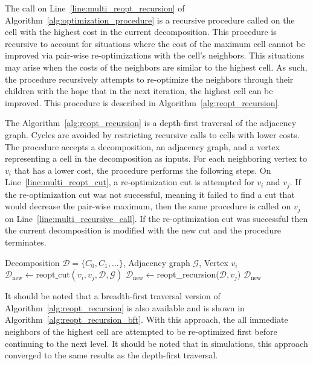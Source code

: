 \documentclass[../main.tex]{subfiles}
\begin{document}
The call on Line~\ref{line:multi_reopt_recursion} of Algorithm~\ref{alg:optimization_procedure} is a recursive procedure called on the cell with the highest cost in the current decomposition. This procedure is recursive to account for situations where the cost of the maximum cell cannot be improved via pair-wise re-optimizations with the cell's neighbors. This situations may arise when the costs of the neighbors are similar to the highest cell. As such, the procedure recursively attempts to re-optimize the neighbors through their children with the hope that in the next iteration, the highest cell can be improved. This procedure is described in Algorithm~\ref{alg:reopt_recursion}.

The Algorithm~\ref{alg:reopt_recursion} is a depth-first traversal of the adjacency graph. Cycles are avoided by restricting recursive calls to cells with lower costs. The procedure accepts a decomposition, an adjacency graph, and a vertex representing a cell in the decomposition as inputs. For each neighboring vertex to $v_i$ that has a lower cost, the procedure performs the following steps. On Line~\ref{line:multi_reopt_cut}, a re-optimization cut is attempted for $v_i$ and $v_j$. If the re-optimization cut was not successful, meaning it failed to find a cut that would decrease the pair-wise maximum, then the same procedure is called on $v_j$ on Line~\ref{line:multi_recursive_call}. If the re-optimization cut was successful then the current decomposition is modified with the new cut and the procedure terminates.

\begin{algorithm}
	\caption{$\text{reopt\_recursion}(\mathcal{D}, \mathcal{G}, v_i)$}
	\label{alg:reopt_recursion}
	\begin{algorithmic}[1]
		\REQUIRE Decomposition $\mathcal{D}=\{C_0,C_1,\ldots\}$, Adjacency graph $\mathcal{G}$, Vertex $v_i$
					\STATE $\mathcal{D}_{\text{new}}\gets\text{reopt\_cut}(v_i,v_j,\mathcal{D},\mathcal{G})$ \label{line:multi_reopt_cut}
						\STATE $\mathcal{D}_{\text{new}}\gets$reopt\_recursion($\mathcal{D},v_j$)\label{line:multi_recursive_call}
					\ENDIF
					\RETURN $\mathcal{D}_{\text{new}}$
				\ENDIF
			\ENDFOR
	\end{algorithmic}
\end{algorithm}

It should be noted that a breadth-first traversal version of Algorithm~\ref{alg:reopt_recursion} is also available and is shown in Algorithm~\ref{alg:reopt_recursion_bft}. With this approach, the all immediate neighbors of the highest cell are attempted to be re-optimized first before continuing to the next level. It should be noted that in simulations, this approach converged to the same results as the depth-first traversal.
\end{document}
